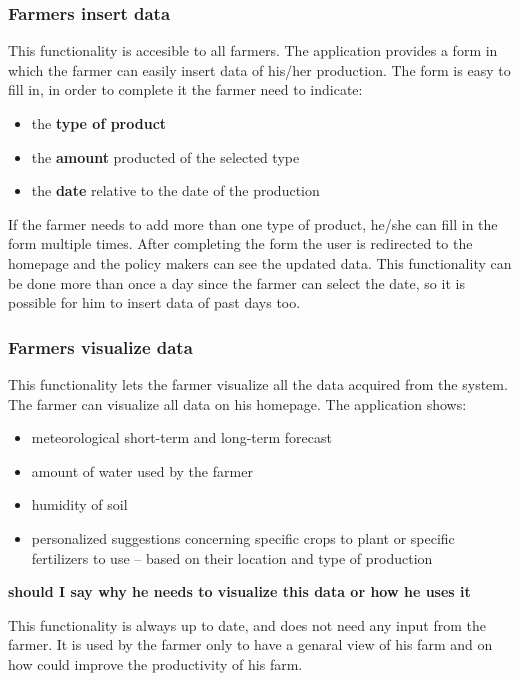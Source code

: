 \documentclass{article}
\begin{document}
\subsubsection{Farmers insert data} 
This functionality is accesible to all farmers. 
The application provides a form in which the farmer can easily insert data of his/her production.
The form is easy to fill in, in order to complete it the farmer need to indicate:
\begin{itemize}
    \item the \textbf{type of product}
    \item the \textbf{amount} producted of the selected type
    \item the \textbf{date} relative to the date of the production
\end{itemize}
If the farmer needs to add more than one type of product, 
he/she can fill in the form multiple times.
After completing the form the user is redirected to the homepage and the policy makers 
can see the updated data.
This functionality can be done more than once a day since the farmer can select the date, 
so it is possible for him to insert data of past days too.



\subsubsection{Farmers visualize data}
This functionality lets the farmer visualize all the data 
acquired from the system. The farmer can visualize all data on his homepage.\newline
The application shows:
\begin{itemize}
    \item meteorological  short-term and long-term forecast
    \item amount of water used by the farmer
    \item humidity of soil 
    \item personalized suggestions concerning specific crops to plant or specific 
    fertilizers to use – based on their location and type of production
\end{itemize}

\textbf{should I say why he needs to visualize this data or how he uses it}
\newline

This functionality is always up to date, and does not need 
any input from the farmer.
It is used by the farmer only to have a genaral view of 
his farm and on how could improve the productivity of his farm.
\end{document}
